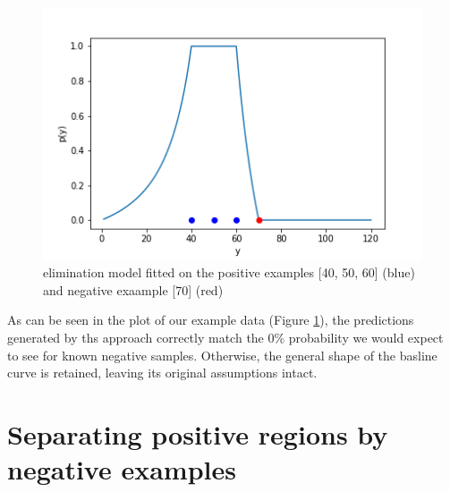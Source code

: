\documentclass[12pt, ]{scrartcl}
\begin{document}
\begin{multicols}{2}
\begin{figure}[H]
	\centering
	\includegraphics[scale=0.5]{graphics/elimination_model}
	\caption{elimination model fitted on the positive examples [40, 50, 60] (blue) and negative exaample [70] (red)}
	\label{fig:elim}
\end{figure}

As can be seen in the plot of our example data (Figure \ref{fig:elim}), the predictions generated by ths approach correctly match the 0\% probability we would expect to see for known negative samples. Otherwise, the general shape of the basline curve is retained, leaving its original assumptions intact.

\section{Separating positive regions by negative examples}



\end{multicols}
\end{document}
